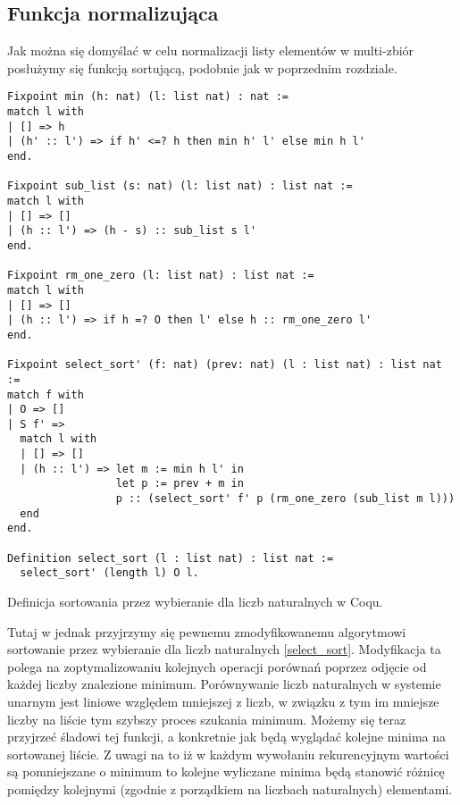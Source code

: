 \subsection{Funkcja normalizująca}
Jak można się domyślać w celu normalizacji listy elementów w multi-zbiór posłużymy się funkcją sortującą, podobnie jak w poprzednim rozdziale. 
\begin{code}
\begin{verbatim}
Fixpoint min (h: nat) (l: list nat) : nat :=
match l with
| [] => h
| (h' :: l') => if h' <=? h then min h' l' else min h l'
end.

Fixpoint sub_list (s: nat) (l: list nat) : list nat :=
match l with
| [] => []
| (h :: l') => (h - s) :: sub_list s l'
end.

Fixpoint rm_one_zero (l: list nat) : list nat :=
match l with
| [] => []
| (h :: l') => if h =? O then l' else h :: rm_one_zero l'
end.

Fixpoint select_sort' (f: nat) (prev: nat) (l : list nat) : list nat :=
match f with
| O => []
| S f' =>
  match l with
  | [] => []
  | (h :: l') => let m := min h l' in
                 let p := prev + m in
                 p :: (select_sort' f' p (rm_one_zero (sub_list m l)))
  end
end.

Definition select_sort (l : list nat) : list nat :=
  select_sort' (length l) O l.
\end{verbatim}
\caption{Definicja sortowania przez wybieranie dla liczb naturalnych w Coqu.}
\label{select_sort}
\end{code}
Tutaj w jednak przyjrzymy się pewnemu zmodyfikowanemu algorytmowi sortowanie przez wybieranie dla liczb naturalnych \ref{select_sort}. Modyfikacja ta polega na zoptymalizowaniu kolejnych operacji porównań poprzez odjęcie od każdej liczby znalezione minimum. Porównywanie liczb naturalnych w systemie unarnym jest liniowe względem mniejszej z liczb, w związku z tym im mniejsze liczby na liście tym szybszy proces szukania minimum. Możemy się teraz przyjrzeć śladowi tej funkcji, a konkretnie jak będą wyglądać kolejne minima na sortowanej liście. Z uwagi na to iż w każdym wywołaniu rekurencyjnym wartości są pomniejszane o minimum to kolejne wyliczane minima będą stanowić różnicę pomiędzy kolejnymi (zgodnie z porządkiem na liczbach naturalnych) elementami.
